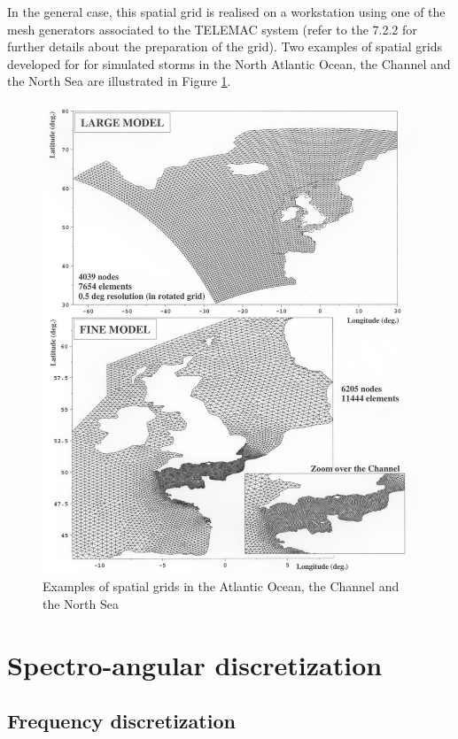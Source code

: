  In the general case, this spatial grid is realised on a workstation using one of the mesh generators associated to the TELEMAC system (refer to the 7.2.2 for further details about the preparation of the grid). Two examples of spatial grids developed for \tomawac for simulated storms in the North Atlantic Ocean, the Channel and the North Sea are illustrated in Figure \ref{fig:mailocean}.
\begin{figure}[htbp]%
\begin{center}
\includegraphics*[width=5.5in ]{graphics/mailocean.jpg}
\caption{Examples of spatial grids in the Atlantic Ocean, the Channel and the North Sea}
\label{fig:mailocean}
\end{center}
\end{figure}
\section{ Spectro-angular discretization}
\label{se:spectroangdis}

\subsection{ Frequency discretization}

